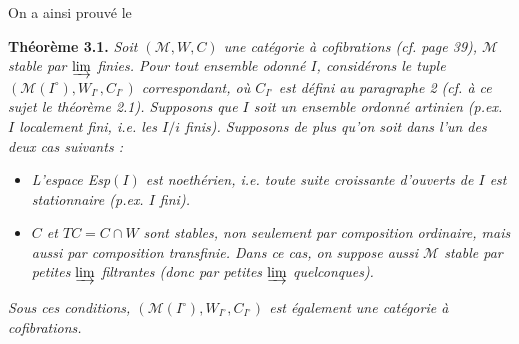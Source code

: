 On a ainsi prouvé le


\textbf{Théorème 3.1.} \textit{Soit $(\mathcal{M},W,C)$ une catégorie à cofibrations (cf. page \textup{39}), $\mathcal{M}$ stable par $\varinjlim$ finies. Pour tout ensemble odonné $I$, considérons le tuple $(\mathcal{M}(I^\circ),W_{I^\circ},C_{I^\circ})$ correspondant, où $C_{I^\circ}$ est défini au paragraphe \textup{2} (cf. à ce sujet le théorème \textup{2.1}). Supposons que $I$ soit un ensemble ordonné \textup{artinien} (p.ex. $I$ localement fini, i.e. les $I/i$ finis). Supposons de plus qu'on soit dans l'un des deux cas suivants :} %
\begin{itemize}[leftmargin=2.5em]
\item[a)] \textit{L'espace \textup{Esp}$(I)$ est noethérien, i.e. toute suite croissante d'ouverts de $I$ est stationnaire (p.ex. $I$ fini).}
\item[b)] \textit{$C$ et $TC=C\cap W$ sont stables, non seulement par composition ordinaire, mais aussi par composition transfinie. Dans ce cas, on suppose aussi $\mathcal{M}$ stable par petites $\varinjlim$ filtrantes (donc par petites $\varinjlim$ quelconques).}
\end{itemize}
\textit{Sous ces conditions, $(\mathcal{M}(I^\circ),W_{I^\circ},C_{I^\circ})$ est également une catégorie à cofibrations.}

